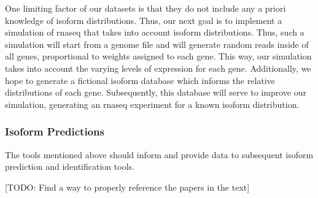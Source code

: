 \documentclass[12pt]{article}
\begin{document}
One limiting factor of our datasets is that they do not include any a priori knowledge of isoform distributions. Thus, our next goal is to implement a simulation of \acrshort{rnaseq} that takes into account isoform distributions. Thus, such a simulation will start from a genome file and will generate random reads inside of all genes, proportional to weights assigned to each gene. This way, our simulation takes into account the varying levels of expression for each gene. Additionally, we hope to generate a fictional isoform database which informs the relative distributions of each gene. Subsequently, this database will serve to improve our simulation, generating an \acrshort{rnaseq} experiment for a known isoform distribution. 

\subsubsection{Isoform Predictions}\label{prediction}
The tools mentioned above should inform and provide data to subsequent isoform prediction and identification tools. 





\printglossary[type=\acronymtype,title=Abbreviations]






{\tiny [TODO: Find a way to properly reference the papers in the text] }
\end{document}
